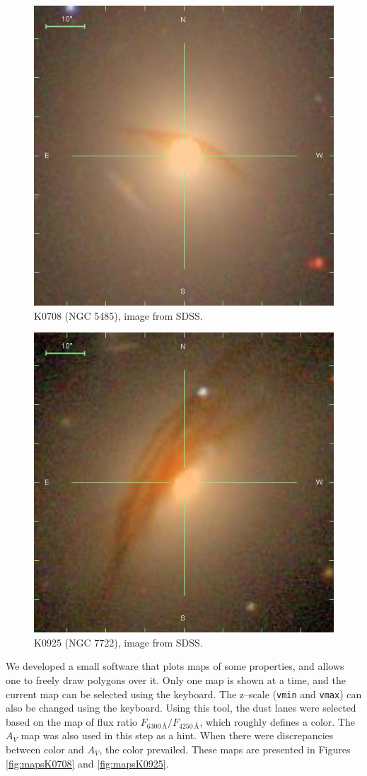 \documentclass[a4paper]{article}
\newcommand{\angstrom}{\text{\AA}}
\begin{document}
\begin{figure}
\begin{center}
\includegraphics[width=0.6\columnwidth]{figures/K0708.png}
\end{center}

\caption{K0708 (NGC 5485), image from SDSS.}
\label{fig:sdssK0708}
\end{figure}

\begin{figure}
\begin{center}
\includegraphics[width=0.6\columnwidth]{figures/K0925.png}
\end{center}

\caption{K0925 (NGC 7722), image from SDSS.}
\label{fig:sdssK0925}
\end{figure}

We developed a small software that plots maps of some properties, and allows one
to freely draw polygons over it. Only one map is shown at a time, and the
current map can be selected using the keyboard. The z--scale (\texttt{vmin} and
\texttt{vmax}) can also be changed using the keyboard. Using this tool, the dust
lanes were selected based on the map of flux ratio $F_{6300\,\angstrom} /
F_{4250\,\angstrom}$, which roughly defines a color.
The $A_V$ map was also used in this step as a hint. When there were
discrepancies between color and $A_V$, the color prevailed. These maps are
presented in Figures \ref{fig:mapsK0708} and \ref{fig:mapsK0925}.
\end{document}
